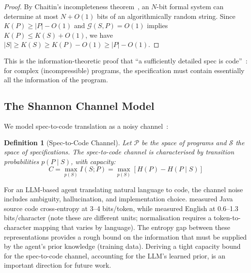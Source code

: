 \documentclass[11pt, a4paper, copyright]{googledeepmind}
\newtheorem{definition}{Definition}[section]
\begin{document}
\begin{proof}
By Chaitin's incompleteness theorem~\citep{chaitin1966length}, an $N$-bit formal system can determine at most $N + O(1)$ bits of an algorithmically random string. Since $K(P) \geq |P| - O(1)$ and $\mathcal{G}(S, P) = O(1)$ implies $K(P) \leq K(S) + O(1)$, we have $|S| \geq K(S) \geq K(P) - O(1) \geq |P| - O(1)$.
\end{proof}

This is the information-theoretic proof that ``a sufficiently detailed spec is code''~\citep{gonzalez2026spec}: for complex (incompressible) programs, the specification must contain essentially all the information of the program.

\subsection{The Shannon Channel Model}

We model spec-to-code translation as a noisy channel~\citep{shannon1948mathematical}:

\begin{definition}[Spec-to-Code Channel]
Let $\mathcal{P}$ be the space of programs and $\mathcal{S}$ the space of specifications. The spec-to-code \emph{channel} is characterised by transition probabilities $p(P \mid S)$, with capacity:
\begin{equation}
    C = \max_{p(S)} I(S; P) = \max_{p(S)} \left[ H(P) - H(P \mid S) \right]
\end{equation}
\end{definition}

For an LLM-based agent translating natural language to code, the channel noise includes ambiguity, hallucination, and implementation choice. \citet{hindle2012naturalness} measured Java source code cross-entropy at 3--4 bits/token, while \citet{shannon1951prediction} measured English at 0.6--1.3 bits/character (note these are different units; normalisation requires a token-to-character mapping that varies by language). The entropy gap between these representations provides a rough bound on the information that must be supplied by the agent's prior knowledge (training data). Deriving a tight capacity bound for the spec-to-code channel, accounting for the LLM's learned prior, is an important direction for future work.
\end{document}
